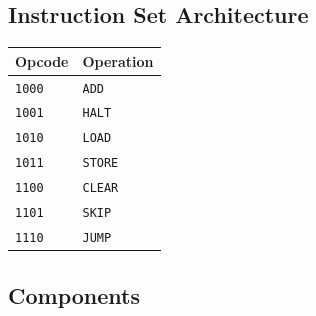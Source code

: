 \documentclass[12pt]{article}
\begin{document}
\subsection{Instruction Set Architecture}
\begin{center}
    \begin{tabular}{|p{3cm}|p{3cm}|}
        \hline
        \textbf{Opcode} & \textbf{Operation} \\
        \hline
        \verb|1000|     & \verb|ADD|         \\
        \hline
        \verb|1001|     & \verb|HALT|        \\
        \hline
        \verb|1010|     & \verb|LOAD|        \\
        \hline
        \verb|1011|     & \verb|STORE|       \\
        \hline
        \verb|1100|     & \verb|CLEAR|       \\
        \hline
        \verb|1101|     & \verb|SKIP|        \\
        \hline
        \verb|1110|     & \verb|JUMP|        \\
        \hline
    \end{tabular}
\end{center}

\subsection{Components}
\end{document}
